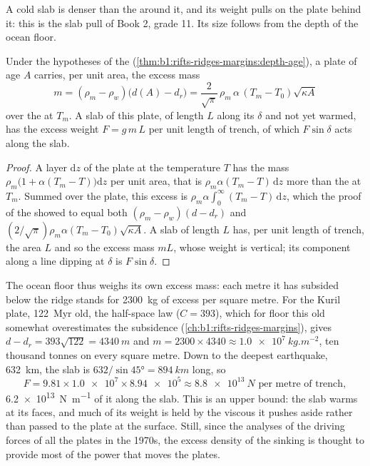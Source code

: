 A cold slab is denser than the  around it, and its weight pulls on the
plate behind it: this is the slab pull of Book 2, grade 11. Its size follows
from the depth of the ocean floor.

\begin{proposition}\label{prop:b1:active-margins:slab-weight}
Under the hypotheses of the 
(\cref{thm:b1:rifts-ridges-margins:depth-age}), a plate of age $A$ carries, per
unit area, the excess mass
\[
  m = (\rho_m - \rho_w)\bigl(d(A) - d_r\bigr)
    = \frac{2}{\sqrt\pi}\,\rho_m\,\alpha\,(T_m - T_0)\sqrt{\kappa A}
\]
over the  at $T_m$. A slab of this plate, of length $L$ along its 
$\delta$ and not yet warmed, has the excess weight $F = g\,m\,L$ per unit length
of trench, of which $F\sin\delta$ acts along the slab.
\end{proposition}

\begin{proof}
A layer $\mathrm dz$ of the plate at the temperature $T$ has the mass
$\rho_m\bigl(1 + \alpha(T_m - T)\bigr)\mathrm dz$ per unit area, that is
$\rho_m\alpha(T_m - T)\,\mathrm dz$ more than the  at $T_m$. Summed over the
plate, this excess is $\rho_m\alpha\int_0^\infty (T_m - T)\,\mathrm dz$, which
the proof of the  showed to equal both
$(\rho_m - \rho_w)(d - d_r)$ and $(2/\sqrt\pi)\rho_m\alpha(T_m - T_0)
\sqrt{\kappa A}$. A slab of length $L$ has, per unit length of trench, the area
$L$ and so the excess mass $mL$, whose weight is vertical; its component along a
line dipping at $\delta$ is $F\sin\delta$.
\end{proof}

The ocean floor thus weighs its own excess mass: each metre it has subsided
below the ridge stands for \qty{2300}{kg} of excess per square metre. For the
Kuril plate, \qty{122}{Myr} old, the half-space law ($C = 393$), which for floor
this old somewhat overestimates the subsidence (\cref{ch:b1:rifts-ridges-margins}),
gives $d - d_r = 393\sqrt{122} = \qty{4340}{m}$ and
$m = 2300\times4340 \approx \qty{1.0e7}{kg.m^{-2}}$, ten thousand tonnes on every square
metre. Down to the deepest earthquake, \qty{632}{km}, the slab is
$632/\sin\ang{45} = \qty{894}{km}$ long, so
\[
  F = 9.81 \times \num{1.0e7} \times \num{8.94e5} \approx \qty{8.8e13}{N}
  \text{ per metre of trench},
\]
\qty{6.2e13}{N.m^{-1}} of it along the slab. This is an upper bound: the slab
warms at its faces, and much of its weight is held by the viscous  it
pushes aside rather than passed to the plate at the surface. Still, since the
analyses of the driving forces of all the plates in the 1970s, the excess
density of the sinking  is thought to provide most of the power that
moves the plates.

